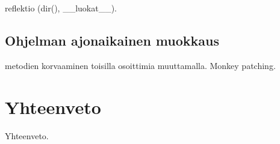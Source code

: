 \documentclass[finnish]{tktltiki2}
\theoremstyle{definition}
\theoremstyle{remark}
\begin{document}
reflektio (dir(), \_\_luokat\_\_). 




\subsection{Ohjelman ajonaikainen muokkaus}

metodien korvaaminen toisilla osoittimia muuttamalla. Monkey patching.

\section{Yhteenveto}

Yhteenveto.


\pagebreak

%
%
% 
%




\lastpage
\end{document}
